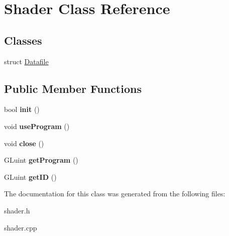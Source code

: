 \hypertarget{classShader}{}\section{Shader Class Reference}
\label{classShader}
\subsection*{Classes}
\begin{DoxyCompactItemize}
\item 
struct \mbox{\hyperlink{structShader_1_1Datafile}{Datafile}}
\end{DoxyCompactItemize}
\subsection*{Public Member Functions}
\begin{DoxyCompactItemize}
\item 
\mbox{\label{classShader_a34a5639bd5b3a138fdaf338c7da79da0}} 
bool {\bfseries init} ()
\item 
\mbox{\label{classShader_a78dd190177e9d0062d150da522ab3125}} 
void {\bfseries use\+Program} ()
\item 
\mbox{\label{classShader_a5098b202f4f74fb8b7936d0a142c5bee}} 
void {\bfseries close} ()
\item 
\mbox{\label{classShader_ab3b6ebf2670424320d518f417a676fc2}} 
G\+Luint {\bfseries get\+Program} ()
\item 
\mbox{\label{classShader_ad1bc9a16400499ec80c4f716a390abaf}} 
G\+Luint {\bfseries get\+ID} ()
\end{DoxyCompactItemize}


The documentation for this class was generated from the following files\+:\begin{DoxyCompactItemize}
\item 
shader.\+h\item 
shader.\+cpp\end{DoxyCompactItemize}
